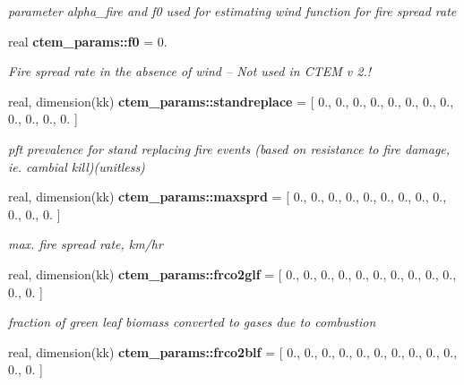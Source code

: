 \begin{DoxyCompactItemize}
\begin{DoxyCompactList}\small\item\em parameter alpha\+\_\+fire and f0 used for estimating wind function for fire spread rate \end{DoxyCompactList}\item 
\hypertarget{namespacectem__params_af0e5f58c072516e8d0d757f843161bc5}{}real {\bfseries ctem\+\_\+params\+::f0} = 0.\label{namespacectem__params_af0e5f58c072516e8d0d757f843161bc5}

\begin{DoxyCompactList}\small\item\em Fire spread rate in the absence of wind -- Not used in C\+T\+E\+M v 2.! \end{DoxyCompactList}\item 
\hypertarget{namespacectem__params_a5086cd6fb3b85a2882e7aa2683598f9b}{}real, dimension(kk) {\bfseries ctem\+\_\+params\+::standreplace} = \mbox{[} 0., 0., 0., 0., 0., 0., 0., 0., 0., 0., 0., 0. \mbox{]}\label{namespacectem__params_a5086cd6fb3b85a2882e7aa2683598f9b}

\begin{DoxyCompactList}\small\item\em pft prevalence for stand replacing fire events (based on resistance to fire damage, ie. cambial kill)(unitless) \end{DoxyCompactList}\item 
\hypertarget{namespacectem__params_a9eac43cb4ce26be279a87b758a8dece2}{}real, dimension(kk) {\bfseries ctem\+\_\+params\+::maxsprd} = \mbox{[} 0., 0., 0., 0., 0., 0., 0., 0., 0., 0., 0., 0. \mbox{]}\label{namespacectem__params_a9eac43cb4ce26be279a87b758a8dece2}

\begin{DoxyCompactList}\small\item\em max. fire spread rate, km/hr \end{DoxyCompactList}\item 
\hypertarget{namespacectem__params_a375be0a1145e49eeea706777032433d0}{}real, dimension(kk) {\bfseries ctem\+\_\+params\+::frco2glf} = \mbox{[} 0., 0., 0., 0., 0., 0., 0., 0., 0., 0., 0., 0. \mbox{]}\label{namespacectem__params_a375be0a1145e49eeea706777032433d0}

\begin{DoxyCompactList}\small\item\em fraction of green leaf biomass converted to gases due to combustion \end{DoxyCompactList}\item 
\hypertarget{namespacectem__params_a9a3a13ca8c1ce9a4b4eafa3ce20308f1}{}real, dimension(kk) {\bfseries ctem\+\_\+params\+::frco2blf} = \mbox{[} 0., 0., 0., 0., 0., 0., 0., 0., 0., 0., 0., 0. \mbox{]}\label{namespacectem__params_a9a3a13ca8c1ce9a4b4eafa3ce20308f1}


\end{DoxyCompactItemize}
